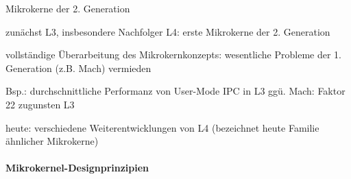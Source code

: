 \documentclass[a4paper]{article}
\begin{document}
\begin{multicols}{3}
    \begin{itemize*}
        \item
        Mikrokerne der 2. Generation
        \item
        zunächst L3, insbesondere Nachfolger L4: erste Mikrokerne der 2.
        Generation
        \item
        vollständige Überarbeitung des Mikrokernkonzepts: wesentliche Probleme
        der 1. Generation (z.B. Mach) vermieden
        \item
        Bsp.: durchschnittliche Performanz von User-Mode IPC in L3 ggü. Mach:
        Faktor 22 zugunsten L3
        \begin{itemize*}
            \item heute: verschiedene Weiterentwicklungen von L4 (bezeichnet heute Familie ähnlicher Mikrokerne)
        \end{itemize*}
    \end{itemize*}


    \paragraph{Mikrokernel-Designprinzipien}


\end{multicols}
\end{document}
